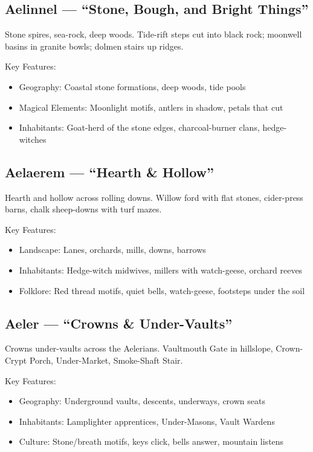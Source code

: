 \subsection{Aelinnel --- ``Stone, Bough, and Bright Things''}
\label{sec:aelinnel}

Stone spires, sea-rock, deep woods. Tide-rift steps cut into black rock; moonwell basins in granite bowls; dolmen stairs up ridges.

Key Features:
\begin{itemize}
    \item Geography: Coastal stone formations, deep woods, tide pools
    \item Magical Elements: Moonlight motifs, antlers in shadow, petals that cut
    \item Inhabitants: Goat-herd of the stone edges, charcoal-burner clans, hedge-witches
\end{itemize}

\subsection{Aelaerem --- ``Hearth \& Hollow''}
\label{sec:aelaerem}

Hearth and hollow across rolling downs. Willow ford with flat stones, cider-press barns, chalk sheep-downs with turf mazes.

Key Features:
\begin{itemize}
    \item Landscape: Lanes, orchards, mills, downs, barrows
    \item Inhabitants: Hedge-witch midwives, millers with watch-geese, orchard reeves
    \item Folklore: Red thread motifs, quiet bells, watch-geese, footsteps under the soil
\end{itemize}

\subsection{Aeler --- ``Crowns \& Under-Vaults''}
\label{sec:aeler}

Crowns under-vaults across the Aelerians. Vaultmouth Gate in hillslope, Crown-Crypt Porch, Under-Market, Smoke-Shaft Stair.

Key Features:
\begin{itemize}
    \item Geography: Underground vaults, descents, underways, crown seats
    \item Inhabitants: Lamplighter apprentices, Under-Masons, Vault Wardens
    \item Culture: Stone/breath motifs, keys click, bells answer, mountain listens
\end{itemize}

